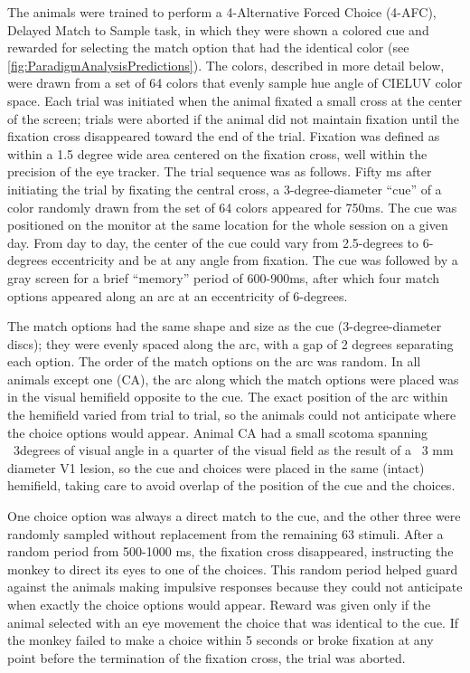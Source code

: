The animals were trained to perform a 4-Alternative Forced Choice (4-AFC), Delayed Match to Sample task, in which they were shown a colored cue and rewarded for selecting the match option that had the identical color (see \autoref{fig:ParadigmAnalysisPredictions}). 
The colors, described in more detail below, were drawn from a set of 64 colors that evenly sample hue angle of CIELUV color space. 
Each trial was initiated when the animal fixated a small cross at the center of the screen; trials were aborted if the animal did not maintain fixation until the fixation cross disappeared toward the end of the trial. 
Fixation was defined as within a 1.5 degree wide area centered on the fixation cross, well within the precision of the eye tracker.
The trial sequence was as follows. 
Fifty ms after initiating the trial by fixating the central cross, a 3-degree-diameter “cue”  of a color randomly drawn from the set of 64 colors appeared for 750ms. 
The cue was positioned on the monitor at the same location for the whole session on a given day.
From day to day, the center of the cue could vary from 2.5-degrees to 6-degrees eccentricity and be at any angle from fixation.
The cue was followed by a gray screen for a brief “memory” period of 600-900ms, after which four match options appeared along an arc at an eccentricity of 6-degrees. 

The match options had the same shape and size as the cue (3-degree-diameter discs); they were evenly spaced along the arc, with a gap of 2 degrees separating each option. 
The order of the match options on the arc was random. %
In all animals except one (CA), the arc along which the match options were placed was in the visual hemifield opposite to the cue. 
The exact position of the arc within the hemifield varied from trial to trial, so the animals could not anticipate where the choice options would appear. 
Animal CA had a small scotoma spanning ~3degrees of visual angle in a quarter of the visual field as the result of a ~3 mm diameter V1 lesion, so the cue and choices were placed in the same (intact) hemifield, taking care to avoid overlap of the position of the cue and the choices. 


One choice option was always a direct match to the cue, and the other three were randomly sampled without replacement from the remaining 63 stimuli. 
After a random period from 500-1000 ms, the fixation cross disappeared, instructing the monkey to direct its eyes to one of the choices. 
This random period helped guard against the animals making impulsive responses because they could not anticipate when exactly the choice options would appear.
Reward was given only if the animal selected with an eye movement the choice that was identical to the cue. 
If the monkey failed to make a choice within 5 seconds or broke fixation at any point before the termination of the fixation cross, the trial was aborted.

